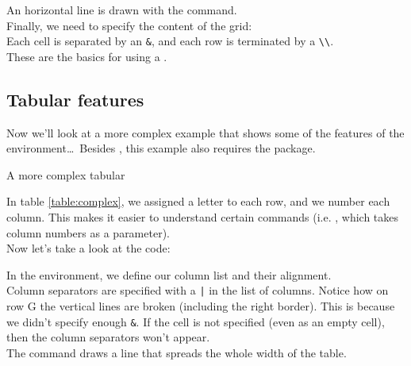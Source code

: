\bigskip
An horizontal line is drawn with the  command. \\

Finally, we need to specify the content of the grid: \\
Each cell is separated by an \texttt{\&}, and each row is terminated by a \lstinline|\\|. \\

These are the basics for using a .

\bigskip
\bigskip



\subsection{Tabular features} \label{tabular-features}

Now we'll look at a more complex example that shows some of the features of the  environment\dots\ 
Besides , this example also requires the  package. \\
\begin{table}[h]
	\caption{A more complex tabular}
	\medskip
	\centering

	\label{table:complex}
\end{table}


In table \ref{table:complex}, we assigned a letter to each row, and we number each column. This makes it easier to understand certain commands (i.e. , which takes column numbers as a parameter). \\

Now let's take a look at the code:


\bigskip


	
In the  environment, we define our column list and their alignment.  \\

Column separators are specified with a \texttt{|} in the list of columns. Notice how on row G the vertical lines are broken (including the right border). This is because we didn't specify enough \texttt{\&}. If the cell is not specified (even as an empty cell), then the column separators won't appear. \\

The  command draws a line that spreads the whole width of the table. \\

